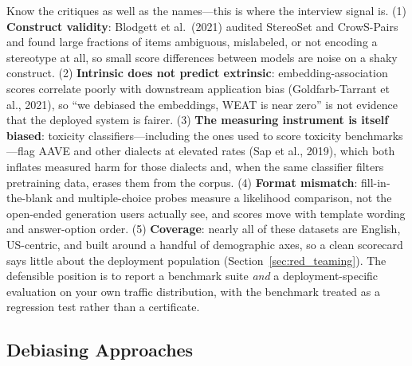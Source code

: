 Know the critiques as well as the names---this is where the interview signal
is.  (1) \textbf{Construct validity}: Blodgett et al.\ (2021) audited
StereoSet and CrowS-Pairs and found large fractions of items ambiguous,
mislabeled, or not encoding a stereotype at all, so small score differences
between models are noise on a shaky construct.  (2) \textbf{Intrinsic does
not predict extrinsic}: embedding-association scores correlate poorly with
downstream application bias (Goldfarb-Tarrant et al., 2021), so ``we debiased
the embeddings, WEAT is near zero'' is not evidence that the deployed system
is fairer.  (3) \textbf{The measuring instrument is itself biased}: toxicity
classifiers---including the ones used to score toxicity benchmarks---flag
AAVE and other dialects at elevated rates (Sap et al., 2019), which both
inflates measured harm for those dialects and, when the same classifier
filters pretraining data, erases them from the corpus.  (4) \textbf{Format
mismatch}: fill-in-the-blank and multiple-choice probes measure a
likelihood comparison, not the open-ended generation users actually see, and
scores move with template wording and answer-option order.  (5)
\textbf{Coverage}: nearly all of these datasets are English, US-centric, and
built around a handful of demographic axes, so a clean scorecard says little
about the deployment population (Section~\ref{sec:red_teaming}).  The
defensible position is to report a benchmark suite \emph{and} a
deployment-specific evaluation on your own traffic distribution, with the
benchmark treated as a regression test rather than a certificate.

\subsection{Debiasing Approaches}

